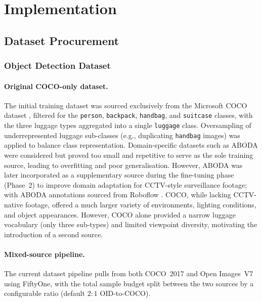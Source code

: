 \section{Implementation}

\subsection{Dataset Procurement}
\label{sec:dataset_procurement}

\subsubsection{Object Detection Dataset}

\paragraph{Original COCO-only dataset.}

The initial training dataset was sourced exclusively from the Microsoft COCO
dataset \citep{lin2014microsoft}, filtered for the \texttt{person},
\texttt{backpack}, \texttt{handbag}, and \texttt{suitcase} classes, with the
three luggage types aggregated into a single \texttt{luggage} class.
Oversampling of underrepresented luggage sub-classes (e.g., duplicating
\texttt{handbag} images) was applied to balance class representation.
Domain-specific datasets such as ABODA were considered but proved too small and
repetitive to serve as the sole training source, leading to overfitting and
poor generalisation. However, ABODA was later incorporated as a supplementary
source during the fine-tuning phase (Phase~2) to improve domain adaptation for
CCTV-style surveillance footage; with ABODA annotations sourced from Roboflow
\citep{aradhya2024aboda}. COCO, while lacking CCTV-native footage, offered a
much larger variety of environments, lighting conditions, and object
appearances. However, COCO alone provided a narrow luggage vocabulary (only
three sub-types) and limited viewpoint diversity, motivating the introduction
of a second source.

\paragraph{Mixed-source pipeline.}

The current dataset pipeline pulls from both COCO~2017 and Open Images~V7
\citep{krasin2017openimages} using FiftyOne, with the total sample budget split
between the two sources by a configurable ratio (default $2{:}1$ OID-to-COCO).

